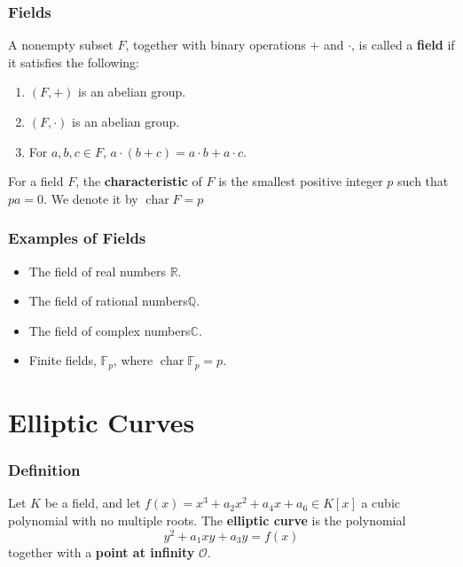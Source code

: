 \documentclass{beamer}
\newcommand{\Q}{\mathbb{Q}}
\newcommand{\CX}{\mathbb{C}}
\newcommand{\R}{\mathbb{R}}
\newcommand{\F}{\mathbb{F}}
\newcommand{\Oc}{\mathcal{O}}
\DeclareMathOperator{\Char}{char}
\theoremstyle{plain} %
\theoremstyle{definition}
\theoremstyle{remark}
\begin{document}
\begin{frame}
\frametitle{Fields}

\begin{definition} A nonempty subset $F$, together with binary operations $+$ and $\cdot$, is called a \textbf{field} if it satisfies the following:
    \begin{enumerate}
        \item $(F,+)$ is an abelian group.
        \item $(F,\cdot)$ is an abelian group.
        \item For $a,b,c \in F$, $a\cdot(b+c)=a\cdot{b}+a\cdot{c}$.
    \end{enumerate}

\end{definition}

\begin{definition}
    For a field $F$, the \textbf{characteristic} of $F$ is the smallest positive integer $p$ such that $pa=0$. We denote it by $\Char{F}=p$
\end{definition}


\end{frame}

\begin{frame}
\frametitle{Examples of Fields}
\begin{itemize}
    \item The field of real numbers $\R$.
    \item The field of rational numbers$\Q$.
    \item The field of complex numbers$\CX$.
    \item Finite fields, $\F_p$, where $\Char{\F_p}=p$.
\end{itemize}


\end{frame}

\section{Elliptic Curves}
\begin{frame}
\frametitle{Definition}

\begin{definition} 
    Let $K$ be a field, and let $f(x)=x^3+a_2x^2+a_4x+a_6 \in K[x]$ a cubic polynomial with no multiple roots. The \textbf{elliptic curve} is the polynomial
        \begin{equation}
            y^2+a_1xy+a_3y=f(x)
        \end{equation}
    together with a \textbf{point at infinity} $\Oc$.

\end{definition}

\end{frame}
\end{document}

